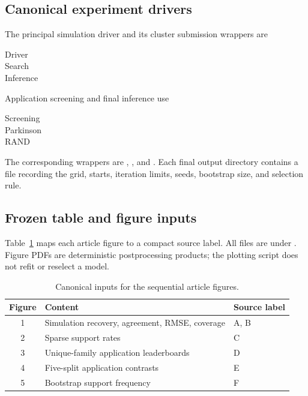 \documentclass[a4paper,fleqn]{cas-sc}
\numberwithin{equation}{section}
\begin{document}
\subsection{Canonical experiment drivers}

The principal simulation driver and its cluster submission wrappers are
\begin{description}
\item[Driver] 
\item[Search] 
\item[Inference] 
\end{description}
Application screening and final inference use
\begin{description}
\item[Screening] 
\item[Parkinson] 
\item[RAND] 
\end{description}
The corresponding wrappers are , , and . Each final output directory contains a  file recording the grid, starts, iteration limits, seeds, bootstrap size, and selection rule.

\subsection{Frozen table and figure inputs}

Table~\ref{supp:tab:artifact-manifest} maps each article figure to a compact source label. All files are under . Figure PDFs are deterministic postprocessing products; the plotting script does not refit or reselect a model.

\begin{table}[t]
\centering
\caption{Canonical inputs for the sequential article figures.}
\label{supp:tab:artifact-manifest}
\small
\begin{tabular}{cll}
\toprule
Figure & Content & Source label\\
\midrule
1 & Simulation recovery, agreement, RMSE, coverage & A, B\\
2 & Sparse support rates & C\\
3 & Unique-family application leaderboards & D\\
4 & Five-split application contrasts & E\\
5 & Bootstrap support frequency & F\\
\bottomrule
\end{tabular}
\end{table}
\end{document}
